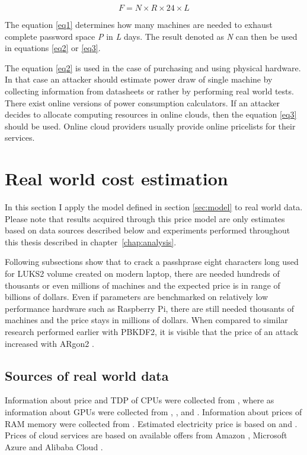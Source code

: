 \documentclass[nolof]{fithesis3}
\begin{document}
\begin{equation}
\label{eq3}
F = N \times R \times 24 \times L
\end{equation}

The equation \ref{eq1} determines how many machines are needed to exhaust complete password space \emph{P} in \emph{L} days. The result denoted as \emph{N} can then be used in equations \ref{eq2} or \ref{eq3}.

The equation \ref{eq2} is used in the case of purchasing and using physical hardware. In that case an attacker should estimate power draw of single machine by collecting information from datasheets or rather by performing real world tests. There exist online versions of power consumption calculators. If an attacker decides to allocate computing resources in online clouds, then the equation \ref{eq3} should be used. Online cloud providers usually provide online pricelists for their services.

\section{Real world cost estimation}
In this section I apply the model defined in section \ref{sec:model} to real world data. Please note that results acquired through this price model are only estimates based on data sources described below and experiments performed throughout this thesis described in chapter~\ref{chap:analysis}.

Following subsections show that to crack a passhprase eight characters long used for LUKS2 volume created on modern laptop, there are needed hundreds of thousants or even millions of machines and the expected price is in range of billions of dollars. Even if parameters are benchmarked on relatively low performance hardware such as Raspberry Pi, there are still needed thousants of machines and the price stays in millions of dollars. When compared to similar research performed earlier with PBKDF2, it is visible that the price of an attack increased with ARgon2 \parencite{pbkdfresearch}.

\subsection{Sources of real world data}
Information about price and TDP of CPUs were collected from \parencite{intelspecs}, where as information about GPUs were collected from \parencite{teslak20}, \parencite{teslap100}, \parencite{geforceprice} and \parencite{geforce}. Information about prices of RAM memory were collected from \parencite{memoryprice}. Estimated electricity price is based on \parencite{electricity} and \parencite{euroelectricity}. Prices of cloud services are based on available offers from Amazon \parencite{amazon} \parencite{amazoncalc}, Microsoft Azure \parencite{azure} and Alibaba Cloud \parencite{alibaba}.
\end{document}
